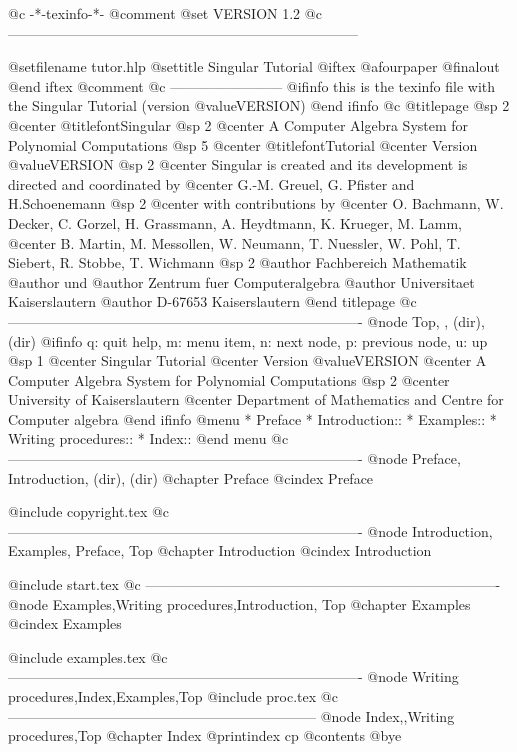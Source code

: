     @c -*-texinfo-*-
@comment %
@set VERSION 1.2
@c ---------------------------------------------------------------------------

@setfilename tutor.hlp
@settitle Singular Tutorial
@iftex
@afourpaper
@finalout
@end iftex
@comment %
@c ------------------------
@ifinfo
this is the texinfo file with the Singular Tutorial (version @value{VERSION})
@end ifinfo
@c
@titlepage
@sp 2
@center @titlefont{Singular}
@sp 2
@center A Computer Algebra System for Polynomial Computations
@sp 5
@center @titlefont{Tutorial}
@center Version @value{VERSION}
@sp 2
@center Singular is created and its development is directed and coordinated by
@center G.-M. Greuel, G. Pfister and H.Schoenemann
@sp 2
@center with contributions by
@center O. Bachmann, W. Decker, C. Gorzel, H. Grassmann, A. Heydtmann, K. Krueger, M. Lamm,
@center B. Martin, M. Messollen, W. Neumann, T. Nuessler, W. Pohl, T. Siebert, R. Stobbe, T. Wichmann
@sp 2
@author Fachbereich Mathematik
@author und
@author Zentrum fuer Computeralgebra
@author Universitaet Kaiserslautern
@author D-67653 Kaiserslautern
@end titlepage
@c ----------------------------------------------------------------------------
@node    Top, ,    (dir),    (dir)
@ifinfo
q: quit help, m: menu item, n: next node, p: previous node, u: up
@sp 1
@center Singular Tutorial
@center Version @value{VERSION}
@center A Computer Algebra System for Polynomial Computations
@sp 2
@center University of Kaiserslautern
@center Department of Mathematics and Centre for Computer algebra
@end ifinfo
@menu
* Preface
* Introduction::
* Examples::
* Writing procedures::
* Index::
@end menu
@c ----------------------------------------------------------------------------
@node Preface, Introduction, (dir),  (dir)
@chapter Preface
@cindex Preface

@include copyright.tex
@c ----------------------------------------------------------------------------
@node Introduction, Examples, Preface, Top
@chapter Introduction
@cindex Introduction

@include start.tex
@c ----------------------------------------------------------------------------
@node Examples,Writing procedures,Introduction, Top
@chapter Examples
@cindex Examples

@include examples.tex
@c ----------------------------------------------------------------------------
@node Writing procedures,Index,Examples,Top
@include proc.tex
@c ------------------------------------------------------------------
@node Index,,Writing procedures,Top
@chapter Index
@printindex cp
@contents
@bye
